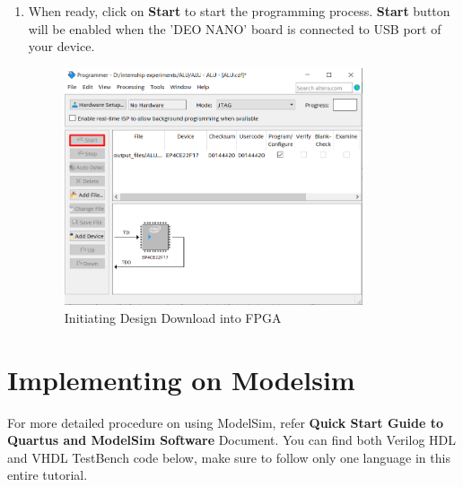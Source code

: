 \documentclass[12pt,singleside,a4paper]{article}
\begin{document}
\begin{enumerate}
     \item When ready, click on \textbf{Start} to start the programming process. \textbf{Start} button will be enabled when the 'DEO NANO' board is connected to USB port of your device. 
     \begin{figure}[H]
         \centering
         \includegraphics[height=7cm,keepaspectratio]{download6.png}
     \caption{Initiating Design Download into FPGA}
     \end{figure}
     
 \end{enumerate}
\newpage
\section{Implementing on Modelsim }
For more detailed procedure on using ModelSim, refer \textbf{Quick Start Guide to Quartus and ModelSim Software} Document. You can find both Verilog HDL and VHDL TestBench code below, make sure to follow only one language in this entire tutorial.
\end{document}
